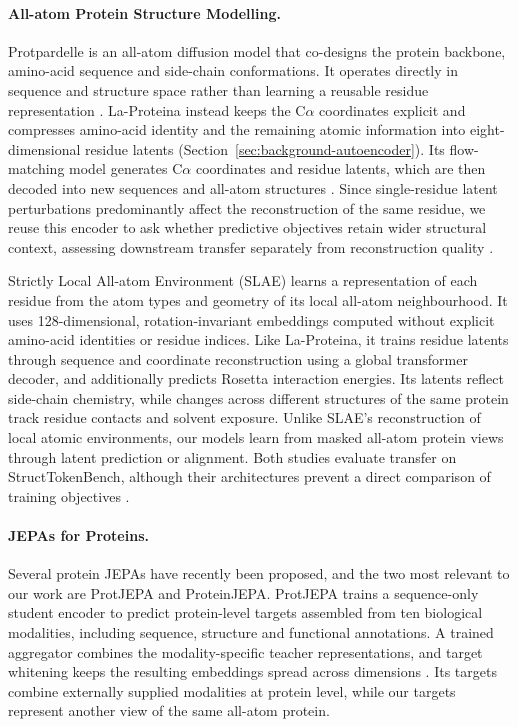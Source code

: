 \paragraph{All-atom Protein Structure Modelling.}
Protpardelle is an all-atom diffusion model that co-designs the protein backbone, amino-acid sequence and side-chain conformations. It operates directly in sequence and structure space rather than learning a reusable residue representation \citep{chu2024allatom}. La-Proteina instead keeps the C$\alpha$ coordinates explicit and compresses amino-acid identity and the remaining atomic information into eight-dimensional residue latents (Section~\ref{sec:background-autoencoder}). Its flow-matching model generates C$\alpha$ coordinates and residue latents, which are then decoded into new sequences and all-atom structures \citep{la-proteina}. Since single-residue latent perturbations predominantly affect the reconstruction of the same residue, we reuse this encoder to ask whether predictive objectives retain wider structural context, assessing downstream transfer separately from reconstruction quality \citep{la-proteina}.

\label{sec:related-work-slae}
Strictly Local All-atom Environment (SLAE) learns a representation of each residue from the atom types and geometry of its local all-atom neighbourhood.
It uses 128-dimensional, rotation-invariant embeddings computed without explicit amino-acid identities or residue indices.
Like La-Proteina, it trains residue latents through sequence and coordinate reconstruction using a global transformer decoder, and additionally predicts Rosetta interaction energies.
Its latents reflect side-chain chemistry, while changes across different structures of the same protein track residue contacts and solvent exposure.
Unlike SLAE's reconstruction of local atomic environments, our models learn from masked all-atom protein views through latent prediction or alignment. Both studies evaluate transfer on StructTokenBench, although their architectures prevent a direct comparison of training objectives \citep{chen2026slae}.

\paragraph{JEPAs for Proteins.}
\label{sec:related-work-protjepa}
Several protein JEPAs have recently been proposed, and the two most relevant to our work are ProtJEPA and ProteinJEPA.
ProtJEPA trains a sequence-only student encoder to predict protein-level targets assembled from ten biological modalities, including sequence, structure and functional annotations. A trained aggregator combines the modality-specific teacher representations, and target whitening keeps the resulting embeddings spread across dimensions \citep{ravideshik2026protjepa}. Its targets combine externally supplied modalities at protein level, while our targets represent another view of the same all-atom protein.

